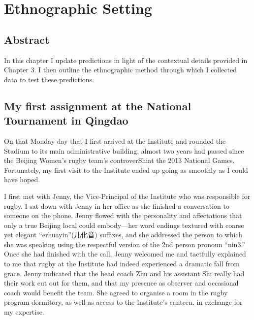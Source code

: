 \chapter{\label{chap:ethnoSetting} Ethnographic Setting}

  \minitoc



\section{Abstract}
In this chapter I update predictions in light of the contextual details provided in Chapter 3.  I then outline the ethnographic method through which I collected data to test these predictions.

                                        \begin{CJK}{UTF8}{gbsn}

\section{My first assignment at the National Tournament in Qingdao \label{sect:qingdaoVignette}}

On that Monday day that I first arrived at the Institute and rounded the Stadium to its main administrative building, almost two years had passed since the Beijing Women's rugby team's controverShiat the 2013 National Games.  Fortunately, my first visit to the Institute ended up going as smoothly as I could have hoped.

I first met with Jenny, the Vice-Principal of the Institute who was responsible for rugby.  I sat down with Jenny in her office as she finished a conversation to someone on the phone. Jenny flowed with the personality and affectations that only a true Beijing local could embody---her word endings textured with coarse yet elegant ``erhuayin''(儿化音) suffixes, and she addressed the person to which she was speaking using the respectful version of the 2nd person pronoun ``nin3.''  Once she had finished with the call, Jenny welcomed me and tactfully explained to me that rugby at the Institute had indeed experienced a dramatic fall from grace.  Jenny indicated that the head coach Zhu and his assistant Shi really had their work cut out for them, and that my presence as observer and occasional coach would benefit the team.  She agreed to organise a room in the rugby program dormitory, as well as access to the Institute's canteen, in exchange for my expertise.


\end{CJK}
